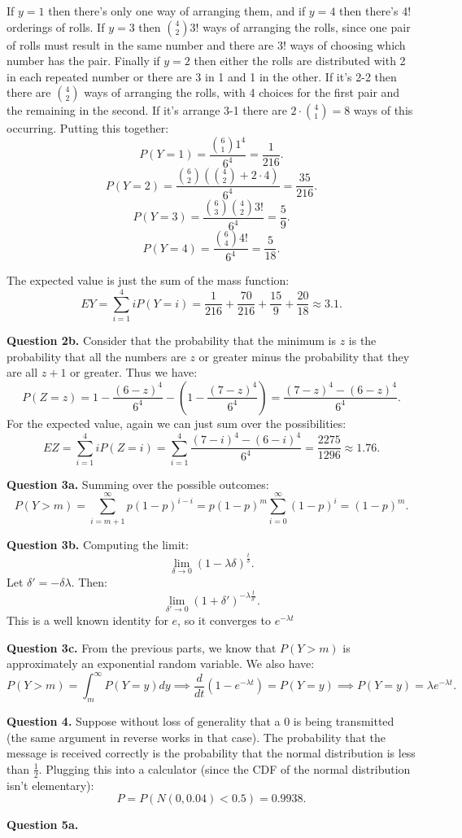 \documentclass[letterpaper, reqno,11pt]{article}
\begin{document}
If $y=1$ then there's only one way of arranging them, and if $y=4$ then there's 4! orderings of rolls. If $y=3$ then ${4\choose 2}3!$ ways of arranging the rolls, since one pair of rolls must result in the same number and there are $3!$ ways of choosing which number has the pair. Finally if $y=2$ then either the rolls are distributed with 2 in each repeated number or there are 3 in 1 and 1 in the other. If it's 2-2 then there are ${4\choose 2}$ ways of arranging the rolls, with 4 choices for the first pair and the remaining in the second. If it's arrange 3-1 there are $2\cdot {4\choose 1}=8$ ways of this occurring. Putting this together: 
\[
    P(Y=1)=\frac{{6\choose 1}1^{4}}{6^{4}}=\frac{1}{216}
.\]
\[
    P(Y=2)=\frac{{6\choose 2}\left( {4\choose 2}+2\cdot 4 \right) }{6^{4}}=\frac{35}{216}
.\]
\[
    P(Y=3)=\frac{{6\choose 3}{4\choose 2}3! }{6^{4}}=\frac{5}{9}
.\]
\[
    P(Y=4)=\frac{{6\choose 4}4! }{6^{4}}=\frac{5}{18}
.\]

The expected value is just the sum of the mass function: 
\[
EY=\sum_{i=1}^{4}i P(Y=i)=\frac{1}{216}+\frac{70}{216}+\frac{15}{9}+\frac{20}{18}\approx 3.1
.\]

{\medskip\noindent\bf Question 2b.} Consider that the probability that the minimum is $z$ is the probability that all the numbers are $z$ or greater minus the probability that they are all $z+1$ or greater. Thus we have: 
\[
P(Z=z)=1-\frac{(6-z)^{4}}{6^{4}}-\left( 1-\frac{(7-z)^{4}}{6^{4}} \right) =\frac{(7-z)^{4}-(6-z)^{4}}{6^{4}}
.\]
For the expected value, again we can just sum over the possibilities: 
\[
EZ=\sum_{i=1}^{4}i P(Z=i)=\sum_{i=1}^{4}\frac{(7-i)^{4}-(6-i)^{4}}{6^{4}}=\frac{2275}{1296}\approx 1.76
.\]

{\medskip\noindent\bf Question 3a.} Summing over the possible outcomes: 
\[
P(Y>m)=\sum_{i=m+1}^{\infty}p(1-p)^{i-i}=p(1-p)^{m}\sum_{i=0}^{\infty}(1-p)^{i}=(1-p)^{m}
.\]

{\medskip\noindent\bf Question 3b.} Computing the limit: 
\[
\lim_{\delta\to 0}\left( 1-\lambda\delta \right)^{\frac{t}{\delta}}
.\]
Let $\delta'=-\delta\lambda$. Then: 
\[
\lim_{\delta'\to 0}\left( 1+\delta' \right)^{-\lambda\frac{t}{\delta'}}
.\]
This is a well known identity for $e$, so it converges to $e^{-\lambda t}$

{\medskip\noindent\bf Question 3c.} From the previous parts, we know that $P(Y>m)$ is approximately an exponential random variable. We also have: 
\[
P(Y>m)=\int_m^{\infty}P(Y=y)dy\implies \frac{d}{dt}(1-e^{-\lambda t})=P(Y=y)\implies P(Y=y)=\lambda e^{-\lambda t}
.\]

{\medskip\noindent\bf Question 4.} Suppose without loss of generality that a 0 is being transmitted (the same argument in reverse works in that case). The probability that the message is received correctly is the probability that the normal distribution is less than $\frac{1}{2}$. Plugging this into a calculator (since the CDF of the normal distribution isn't elementary): 
\[
P=P(N(0,0.04)<0.5)=0.9938
.\]

{\medskip\noindent\bf Question 5a.} 

\end{document}
